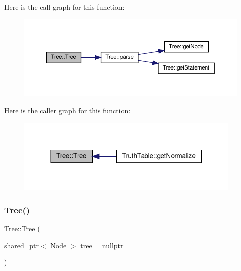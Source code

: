 Here is the call graph for this function\+:\nopagebreak
\begin{figure}[H]
\begin{center}
\leavevmode
\includegraphics[width=350pt]{dd/df8/class_tree_a114a18872bc2535a73ceb0719cde7945_cgraph}
\end{center}
\end{figure}
Here is the caller graph for this function\+:\nopagebreak
\begin{figure}[H]
\begin{center}
\leavevmode
\includegraphics[width=305pt]{dd/df8/class_tree_a114a18872bc2535a73ceb0719cde7945_icgraph}
\end{center}
\end{figure}
\mbox{\label{class_tree_a6515b810a36ab46fa79b9dc9d426a8ff}} 
\subsubsection{\texorpdfstring{Tree()}{Tree()}\hspace{0.1cm}{\footnotesize\ttfamily [2/2]}}
{\footnotesize\ttfamily Tree\+::\+Tree (\begin{DoxyParamCaption}\item[{shared\+\_\+ptr$<$ \hyperlink{class_node}{Node} $>$}]{tree = {\ttfamily nullptr} }\end{DoxyParamCaption})\hspace{0.3cm}{\ttfamily [explicit]}}

\mbox{\label{class_tree_abdc38545cf3f588725b5d8b8075b3866}} 
